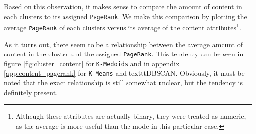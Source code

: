 Based on this observation, it makes sense to compare the amount of content in each clusters to its assigned \texttt{PageRank}. We make this comparison by plotting the average \texttt{PageRank} of each clusters versus its average of the content attributes\footnote{Although these attributes are actually binary, they were treated as numeric, as the average is more useful than the mode in this particular case.}.

As it turns out, there seem to be a relationship between the average amount of content in the cluster and the assigned \texttt{PageRank}. This tendency can be seen in figure \ref{fig:cluster_content} for \texttt{K-Medoids} and in appendix \ref{app:content_pagerank} for \texttt{K-Means} and texttt{DBSCAN}. Obviously, it must be noted that the exact relationship is still somewhat unclear, but the tendency is definitely present.



